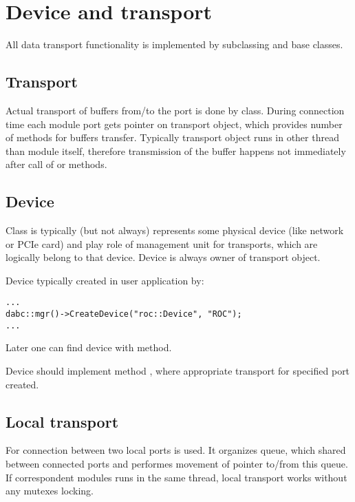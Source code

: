 \section{Device and transport}
\label{prog_plugin_device}
All data transport functionality is implemented by 
   subclassing   and  base classes.

\subsection{Transport}

Actual transport of buffers from/to the port is done by  class.
During connection time each module port gets pointer on transport object, which provides
number of methods for buffers transfer. Typically transport object runs in other thread than module itself, 
therefore transmission of the buffer happens not immediately after call of 
 or  methods.

 

\subsection{Device}

Class  is typically (but not always) represents some physical
device (like network or PCIe card) and play role of management unit for transports,
which are logically belong to that device. Device is always owner of transport object.

Device typically created in user application by:
\begin{small}
\begin{verbatim}
...
dabc::mgr()->CreateDevice("roc::Device", "ROC");
...
\end{verbatim}     
\end{small}

Later one can find device with  method.

Device should implement method , 
where appropriate transport for specified port created.
 

\subsection{Local transport}

For connection between two local ports  is used.
It organizes queue, which shared between connected ports and performes
movement of  pointer to/from this queue.
If correspondent modules runs in the same thread, 
local transport works without any mutexes locking.

